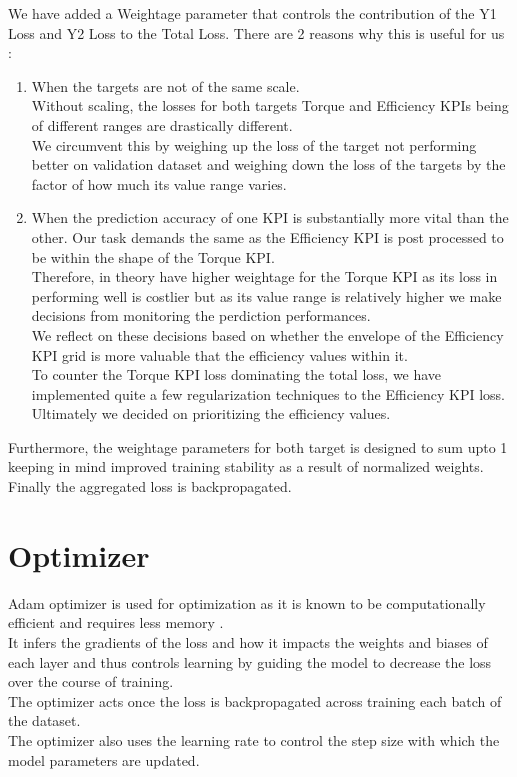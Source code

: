 \documentclass{report} %
\begin{document}
We have added a Weightage parameter that controls the contribution of the Y1 Loss and Y2 Loss to the Total Loss. There are 2 reasons why this is useful for us :
\begin{enumerate}
    \item  When the targets are not of the same scale. \\
    Without scaling, the losses for both targets Torque and Efficiency \ac{KPI}s being of different ranges are drastically different.\\
    We circumvent this by weighing up the loss of the target not performing better on validation dataset and weighing down the loss of the 
    targets by the factor of how much its value range varies.
    \item When the prediction accuracy of one \ac{KPI} is substantially more vital than the other. 
    Our task demands the same as the Efficiency \ac{KPI} is post processed to be within the shape of the Torque \ac{KPI}. \\
    Therefore, in theory have higher weightage for the Torque \ac{KPI} as its loss in performing well is costlier but as its value range is relatively higher we make decisions from monitoring the perdiction performances.\\
    We reflect on these decisions based on whether the envelope of the Efficiency \ac{KPI} grid is more valuable that the efficiency values within it.\\
    To counter the Torque \ac{KPI} loss dominating the total loss, we have implemented quite a few regularization techniques to the Efficiency \ac{KPI} loss.\\
    Ultimately we decided on prioritizing the efficiency values.
\end{enumerate}
Furthermore, the weightage parameters for both target is designed to sum upto 1 keeping in mind improved training stability as a result of normalized weights. \\
Finally the aggregated loss is backpropagated.

\section{Optimizer}\label{sec:Optimizer}

Adam optimizer is used for optimization as it is known to be computationally efficient and requires less memory \cite{ADAM-2017}. \\
It infers the gradients of the loss and how it impacts the weights and biases of each layer and thus controls learning by guiding the model to decrease the loss over the course of training. \\
The optimizer acts once the loss is backpropagated across training each batch of the dataset.\\
The optimizer also uses the learning rate to control the step size with which the model parameters are updated.\\
\end{document}
